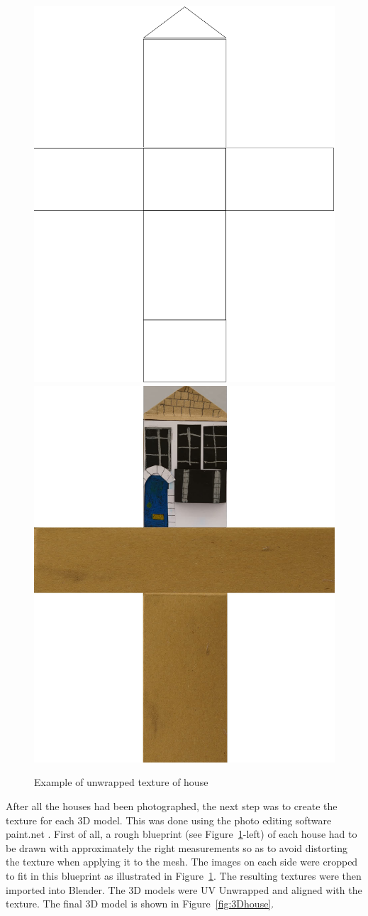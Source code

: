 \documentclass[acmlarge,screen,dvipsnames]{acmart}
\begin{document}
 \begin{figure}[ht] \centering
\includegraphics[width=0.49\linewidth]{images/za_tex_template.png}
\includegraphics[width=0.49\linewidth]{images/za_tex.jpg}
\caption{Example of unwrapped texture of house} \label{fig:pattern}
\end{figure}


After all the houses had been photographed, the next step was to create the
texture for each 3D model. This was done using the photo editing software
paint.net \cite{paintnet}. First of all, a rough blueprint (see
Figure~\ref{fig:pattern}-left) of each house had to be drawn with
approximately the right measurements so as to avoid distorting the texture
when applying it to the mesh. The images on each side were cropped to fit in
this blueprint as illustrated in Figure~\ref{fig:pattern}. The resulting
textures were then imported into Blender. The 3D models were UV Unwrapped and
aligned with the texture. The final 3D model is shown in
Figure~\ref{fig:3Dhouse}. 
\end{document}
